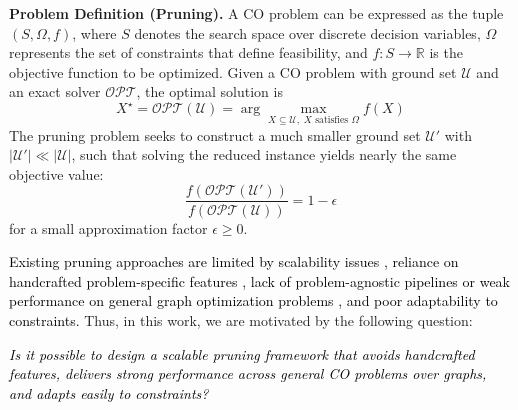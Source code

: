 \textbf{Problem Definition (Pruning).} A CO problem can be expressed as the tuple \( (S, \Omega, f) \), where \( S \) denotes the search space over discrete decision variables, \( \Omega \) represents the set of constraints that define feasibility, and \( f: S \to \mathbb{R} \) is the objective function to be optimized.
Given a CO problem with ground set \(\mathcal{U}\) and an exact solver \(\mathcal{OPT}\), the optimal solution is  
\[
X^\star = \mathcal{OPT}(\mathcal{U}) = \arg\max_{X \subseteq \mathcal{U}, \; X \text{ satisfies } \Omega} f(X)
\]  
The pruning problem seeks to construct a much smaller ground set \(\mathcal{U}'\) with \(|\mathcal{U}'| \ll |\mathcal{U}|\), such that solving the reduced instance yields nearly the same objective value:  
\[
\frac{f(\mathcal{OPT}(\mathcal{U}'))}{f(\mathcal{OPT}(\mathcal{U}))} = 1 - \epsilon
\]  
for a small approximation factor \(\epsilon \geq 0\).  

\textcolor{black}{Existing pruning approaches are limited by scalability issues \citep{zhou2017scaling,pmlr-v258-nath25a}, reliance on handcrafted problem-specific features \citep{ireland2022lense,tian2024combhelper}, lack of problem-agnostic pipelines or weak performance on general graph optimization problems \citep{lauri2019fine,lauri2023learning,manchanda2020gcomb}, and poor adaptability to constraints.} Thus, in this work, we are motivated by the following question:
\begin{center}
    \textcolor{black}{\textit{Is it possible to design a scalable pruning framework that avoids handcrafted features, delivers strong performance across general CO problems over graphs, and adapts easily to constraints?}}
\end{center}

